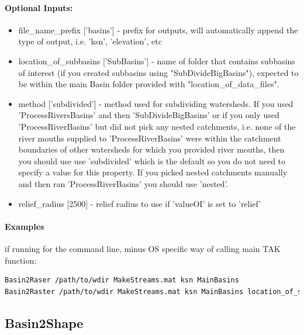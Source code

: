\paragraph{Optional Inputs:}
\begin{itemize}
\item file\_name\_prefix ['basins'] - prefix for outputs, will automatically append the type of output, i.e. 'ksn', 'elevation', etc
\item location\_of\_subbasins ['SubBasins'] - name of folder that contains subbasins of interest (if you created subbasins using
"SubDivideBigBasins"), expected to be within the main Basin folder provided with "location\_of\_data\_files".
\item method ['subdivided'] - method used for subdividing watersheds. If you used 'ProcessRiversBasins' and then
'SubDivideBigBasins' or if you only used 'ProcessRiverBasins' but did not pick any nested catchments, i.e.
none of the river mouths supplied to 'ProcessRiverBasins' were within the catchment boundaries of other 
watersheds for which you provided river mouths, then you should use use 'subdivided' which is the default
so you do not need to specify a value for this property. If you picked nested catchments manually and then
ran 'ProcessRiverBasins' you should use 'nested'.
\item relief\_radius [2500] - relief radius to use if 'valueOI' is set to 'relief'
\end{itemize}

\paragraph{Examples} if running for the command line, minus OS specific way of calling main TAK function:

\begin{lstlisting}[language=bash]
Basin2Raser /path/to/wdir MakeStreams.mat ksn MainBasins
Basin2Raster /path/to/wdir MakeStreams.mat ksn MainBasins location_of_subbasins MySubbasins file_name_prefix Test
\end{lstlisting}

\subsection{Basin2Shape} \label{sec:CmpBsn2Shp}

